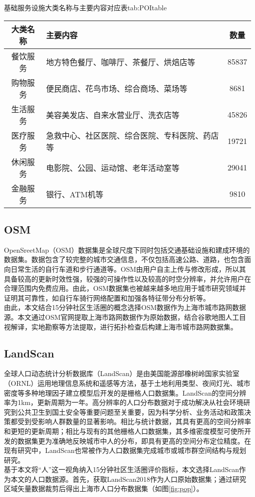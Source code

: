\documentclass{shnuthesis}
\begin{document}
\begin{generaltab}[htb]{基础服务设施大类名称与主要内容对应表}{tab:POItable}
	\renewcommand\arraystretch{1.3} %
	\begin{tabularx}{0.9\textwidth}{CP{10cm}C}
		\toprule[1.5pt]
		大类名称 & 主要内容                    & 数量    \\
		\midrule
		餐饮服务 & 地方特色餐厅、咖啡厅、茶餐厅、烘焙店等     & 85837 \\
		购物服务 & 便民商店、花鸟市场、综合商场、菜场等      & 8681  \\
		生活服务 & 美容美发店、自来水营业厅、洗衣店等       & 45826 \\
		医疗服务 & 急救中心、社区医院、综合医院、专科医院、药店等 & 19721 \\
		休闲服务 & 电影院、公园、运动馆、老年活动室等   & 29041 \\
		金融服务 & 银行、ATM机等                & 9810 \\
		\bottomrule[1.5pt]		
	\end{tabularx}
\end{generaltab}

\subsection{OSM}
OpenSreetMap（OSM）数据集是全球尺度下同时包括交通基础设施和建成环境的数据集。数据包含了较完整的城市交通信息，不仅包括高速公路、道路，也包含面向日常生活的自行车道和步行通道等\textsuperscript{\cite{haklay2008}}。OSM由用户自主上传与修改形成，所以其具备较高的更新时效性强，较强的可操作性以及较高的时空分辨率，并允许用户在合理范围内免费应用。由此，OSM数据集也被越来越多地应用于城市研究领域并证明其可靠性，如自行车骑行网络配置和加强各特征带分布分析等\textsuperscript{\cite{fonte2019,colinferster2019}}。\\
\indent 由此，本文结合15分钟社区生活圈的概念选择OSM数据作为上海市城市路网数据源。本文通过OSM官网提取上海市路网数据作为原始数据，结合谷歌地图人工目视解译，实地勘察等方法提取，进行拓扑检查后构建上海市城市路网数据集。

\subsection{LandScan}

全球人口动态统计分析数据库（LandScan）是由美国能源部橡树岭国家实验室（ORNL）运用地理信息系统和遥感等方法，基于土地利用类型、夜间灯光、城市密度等多种地理因子建立模型后开发的是栅格人口数据集\textsuperscript{\cite{bhaduri2007}}。LandScan的空间分辨率为1km，更新周期为一年。高分辨率的人口分布数据对于成功解决从社会环境研究到公共卫生到国土安全等重要问题至关重要，因为科学分析、业务活动和政策决策都受到受影响人群数量的显著影响。相比与统计数据，其具有更高的空间分辨率和更短的更新周期；相比与现有的其他栅格人口数据集，其多维密度模型可使所开发的数据集更为准确地反映城市中人的分布，即具有更高的空间分布定位精度。在现有研究中，LandScan也常被作为人口数据集完成城市或城市群空间结构与规划研究\textsuperscript{\cite{calka2019,sun2019}}。\\
\indent 基于本文将“人”这一视角纳入15分钟社区生活圈评价指标，本文选择LandScan作为本文的人口数据源。首先，获取LandScan2018作为人口原始数据集；通过研究区域矢量数据裁剪后得出上海市人口分布数据集（如图\ref{fig:pop}）。
\end{document}
